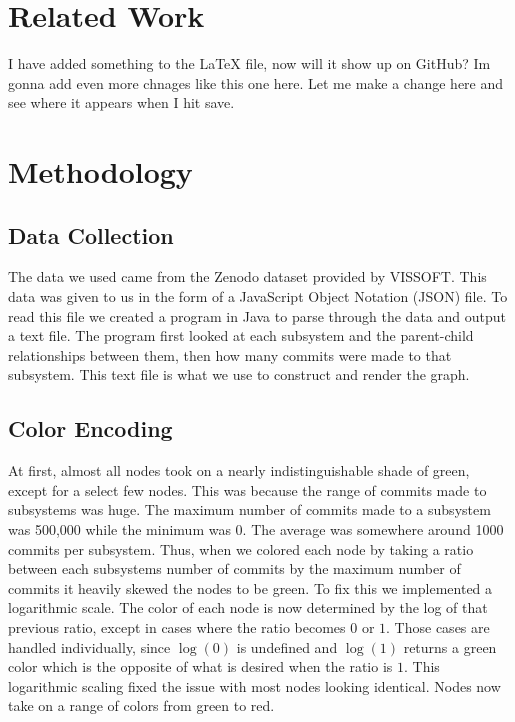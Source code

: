 \documentclass[conference]{IEEEtran}
\begin{document}
\section{Related Work}


I have added something to the LaTeX file, now will it show up on GitHub? Im gonna add even more chnages like this one here. Let me make a change here and see where it appears when I hit save.

\section{Methodology}

\subsection{Data Collection}
The data we used came from the Zenodo dataset provided by VISSOFT. This data was given to us in the form of a JavaScript Object Notation (JSON) file. To read this file we created a program in Java to parse through the data and output a text file. The program first looked at each subsystem and the parent-child relationships between them, then how many commits were made to that subsystem. This text file is what we use to construct and render the graph.

\subsection{Color Encoding}
At first, almost all nodes took on a nearly indistinguishable shade of green, except for a select few nodes. This was because the range of commits made to subsystems was huge. The maximum number of commits made to a subsystem was 500,000 while the minimum was 0. The average was somewhere around 1000 commits per subsystem. Thus, when we colored each node by taking a ratio between each subsystems number of commits by the maximum number of commits it heavily skewed the nodes to be green. To fix this we implemented a logarithmic scale. The color of each node is now determined by the log of that previous ratio, except in cases where the ratio becomes $0$ or $1$. Those cases are handled individually, since $\log(0)$ is undefined and $\log(1)$ returns a green color which is the opposite of what is desired when the ratio is $1$. This logarithmic scaling fixed the issue with most nodes looking identical. Nodes now take on a range of colors from green to red.
\end{document}
